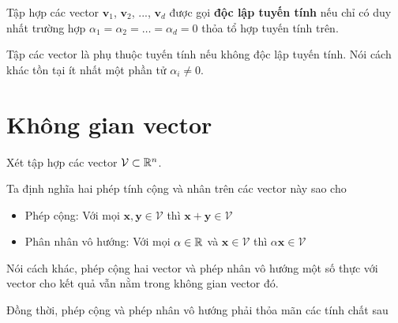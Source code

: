 \begin{definition}
    Tập hợp các vector $\bm{v}_1$, $\bm{v}_2$, ..., $\bm{v}_d$ được gọi \textbf{độc lập tuyến tính} nếu
    chỉ có duy nhất trường hợp $\alpha_1 = \alpha_2 = \ldots = \alpha_d = 0$ thỏa tổ hợp tuyến tính trên.    
\end{definition}

\begin{definition}
    Tập các vector là phụ thuộc tuyến tính nếu không độc lập tuyến tính.
    Nói cách khác tồn tại ít nhất một phần tử $\alpha_i \neq 0$.
\end{definition}

\section{Không gian vector}

Xét tập hợp các vector $\mathcal{V} \subset \mathbb{R}^n$.

Ta định nghĩa hai phép tính cộng và nhân trên các vector này sao cho

\begin{itemize}[noitemsep]
    \item Phép cộng: Với mọi $\bm{x}, \bm{y} \in \mathcal{V}$ thì $\bm{x} + \bm{y} \in \mathcal{V}$
    \item Phân nhân vô hướng: Với mọi $\alpha \in \mathbb{R}$ và $\bm{x} \in \mathcal{V}$ thì $\alpha \bm{x} \in \mathcal{V}$
\end{itemize}

Nói cách khác, phép cộng hai vector và phép nhân vô hướng một số thực với vector cho kết quả vẫn nằm trong không gian vector đó.

Đồng thời, phép cộng và phép nhân vô hướng phải thỏa mãn các tính chất sau

